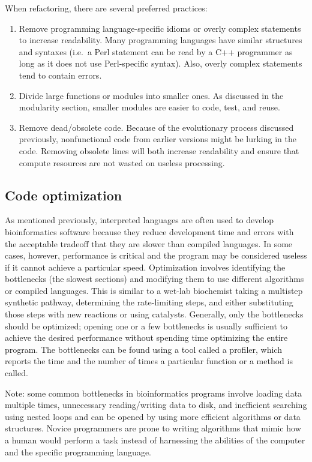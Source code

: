 \documentclass[ChapterTOCs,krantz2]{krantz} %
\begin{document}
When refactoring, there are several preferred practices:  
\begin{enumerate}

\item Remove programming
language-specific idioms or overly complex statements to increase readability.
Many programming languages have similar structures and syntaxes (i.e.\ a Perl
statement can be read by a C++ programmer as long as it does not
use Perl-specific syntax).  Also, overly complex statements 
tend to contain errors.  

\item Divide large
functions or modules into smaller ones.  As discussed in the
modularity section, smaller modules are easier to code, test, and reuse.  

\item Remove dead/obsolete code.  Because of the evolutionary process 
discussed previously,
nonfunctional code from earlier versions might be lurking in the code.
Removing obsolete lines will both increase readability and ensure that compute
resources are not wasted on useless processing.
\end{enumerate}

\subsection{Code optimization}

As mentioned previously, interpreted
languages are often used to develop bioinformatics software because they
reduce development time and errors with the acceptable tradeoff that they are
slower than compiled languages. In some cases, however, performance is critical
and the program may be considered useless if it cannot achieve a particular
speed.  
Optimization involves identifying the bottlenecks (the slowest
sections) and modifying them to use different algorithms or
compiled languages.  This is similar to a wet-lab biochemist taking a multistep
synthetic pathway, determining the rate-limiting steps, and either
substituting those steps with new reactions or using catalysts.  Generally, 
only the
bottlenecks should be optimized; opening one or a few bottlenecks is usually
sufficient to achieve the desired performance without spending time optimizing
the entire program.  The bottlenecks can be found using a tool called a profiler,
which reports the time and the number of times a particular
function or a method is called.

Note: some common bottlenecks in bioinformatics programs involve 
loading data multiple times, unnecessary reading/writing data to disk, 
and inefficient searching using nested loops and can be opened 
by using more efficient algorithms or data structures.  
Novice programmers are prone to writing algorithms that 
mimic how a human would perform a task instead of 
harnessing the abilities of the computer 
and the specific programming language.
\end{document}
